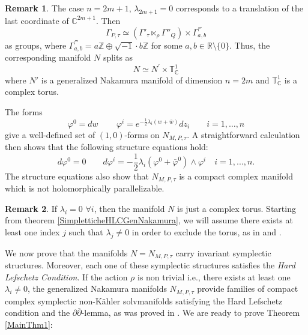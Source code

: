 \documentclass[a4paper, 11pt]{amsart}
\theoremstyle{plain}
\theoremstyle{definition}
\newtheorem{osservazione}{Remark}[section]
\newcommand{\del}{\partial}
\newcommand{\delbar}{\bar{\partial}}
\newcommand{\C}{\mathbb{C}}
\numberwithin{equation}{section}
\begin{document}
\begin{osservazione}\label{LatticeSpezza}
    The case $n = 2m+1$, $\lambda_{2m+1} = 0$ corresponds to a translation of the last coordinate of $\C^{2m+1}$. Then $$\Gamma_{P, \tau} \simeq (\Gamma'_{\tau} \ltimes_{\rho} \Gamma''_{Q}) \times \Gamma^{'''}_{a,b}$$ as groups, where $\Gamma^{'''}_{a,b} = a\mathbb{Z} \oplus \sqrt{-1}\cdot b\mathbb{Z}$ for some $a,b \in \mathbb{R}\setminus \{0\}$. Thus, the corresponding manifold $N$ splits as
    \[N \simeq N^{'} \times \mathbb{T}^{1}_{\mathbb{C}}\]
    where $N'$ is a generalized Nakamura manifold of dimension $n = 2m$ and $\mathbb{T}^{1}_{\mathbb{C}}$ is a complex torus. 
\end{osservazione}
The forms
\begin{equation}
    \varphi^0 = dw\, \qquad \varphi^i = e^{-\frac{1}{2}\lambda_i (w + \bar{w})} dz_i \qquad i = 1, \ldots, n
\end{equation}
give a well-defined set of $(1,0)$-forms on $N_{M, P, \tau}$. A straightforward calculation then shows that the following structure equations hold:
\begin{equation}\label{StrEqn}
    d\varphi^{0} = 0 \qquad d\varphi^{i} = -\dfrac{1}{2}\lambda_{i}(\varphi^{0} + \bar\varphi^{0}) \wedge \varphi^{i} \quad i = 1, ..., n.
\end{equation}
The structure equations also show that $N_{M, P, \tau}$ is a compact complex manifold which is not holomorphically parallelizable.
\begin{osservazione}
    If $\lambda_{i} = 0 $ $\forall i $, then the manifold $N$ is just a complex torus. Starting from theorem \ref{SimpletticheHLCGenNakamura}, we will assume there exists at least one index $j$ such that $\lambda_{j} \ne 0$ in order to exclude the torus, as in \cite{N} and \cite{CT}.
\end{osservazione}
We now prove that the manifolds $N = N_{M, P, \tau}$ carry invariant symplectic structures. Moreover, each one of these symplectic structures satisfies the \textit{Hard Lefschetz Condition}. If the action $\rho$ is non trivial i.e., there exists at least one $\lambda_{i} \ne 0$, the generalized Nakamura manifolds $N_{M, P, \tau}$ provide families of compact complex symplectic non-K\"ahler solvmanifolds satisfying the Hard Lefschetz condition and the $\del\delbar$-lemma, as was proved in \cite[Theorem 4.14]{CT}. We are ready to prove Theorem \ref{MainThm1}:
\end{document}
